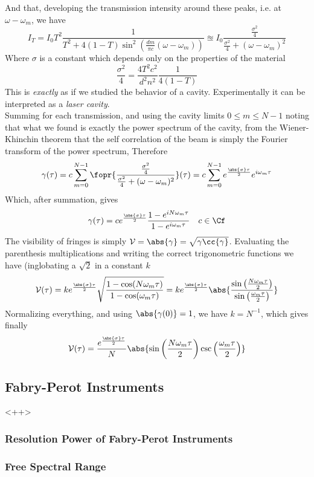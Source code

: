 \documentclass[../electromagnetism.tex]{subfiles}
\begin{document}
And that, developing the transmission intensity around these peaks, i.e. at $\omega-\omega_m$, we have
\begin{equation}
	I_T=I_0T^2\frac{1}{T^2+4(1-T)\sin^2\left( \frac{dm}{\pi c}(\omega-\omega_m) \right)}\approxeq I_0\frac{\frac{\sigma^2}{4}}{\frac{\sigma^2}{4}+(\omega-\omega_m)^2}
	\label{eq:transintdifffreq.mbi}
\end{equation}
Where $\sigma$ is a constant which depends only on the properties of the material
\begin{equation*}
	\frac{\sigma^2}{4}=\frac{4T^2c^2}{d^2n^2}\frac{1}{4(1-T)}
\end{equation*}
This is \textit{exactly} as if we studied the behavior of a cavity. Experimentally it can be interpreted as a \textit{laser cavity}.\\
Summing for each transmission, and using the cavity limits $0\le m\le N-1$ noting that what we found is exactly the power spectrum of the cavity, from the Wiener-Khinchin theorem that the self correlation of the beam is simply the Fourier transform of the power spectrum, Therefore
\begin{equation*}
	\gamma(\tau)=c\sum_{m=0}^{N-1}\fopr{\frac{\frac{\sigma^2}{4}}{\frac{\sigma^2}{4}+(\omega-\omega_m)^2}}(\tau)=c\sum^{N-1}_{m=0}e^{\frac{\abs{\sigma}\tau}{2}}e^{i\omega_m\tau}
\end{equation*}
Which, after summation, gives
\begin{equation}
	\gamma(\tau)=ce^{\frac{\abs{\sigma}\tau}{2}}\frac{1-e^{iN\omega_m\tau}}{1-e^{i\omega_m\tau}}\quad c\in\Cf
	\label{eq:selfcorrlasercavity.mbi}
\end{equation}
The visibility of fringes is simply $\mathcal{V}=\abs{\gamma}=\sqrt{\gamma\cc{\gamma}}$. Evaluating the parenthesis multiplications and writing the correct trigonometric functions we have (inglobating a $\sqrt{2}$ in a constant $k$
\begin{equation}
	\mathcal{V}(\tau)=ke^{\frac{\abs{\sigma}\tau}{2}}\sqrt{\frac{1-\cos(N\omega_m\tau)}{1-\cos(\omega_m\tau)}}=ke^{\frac{\abs{\sigma}\tau}{2}}\abs{\frac{\sin\left( \frac{N\omega_m\tau}{2} \right)}{\sin\left( \frac{\omega_m\tau}{2} \right)}}
	\label{eq:visnonnorm.mbi}
\end{equation}
Normalizing everything, and using $\abs{\gamma(0)}=1$, we have $k=N^{-1}$, which gives finally
\begin{equation}
	\mathcal{V}(\tau)=\frac{e^{\frac{\abs{\sigma}\tau}{2}}}{N}\abs{\sin\left( \frac{N\omega_m\tau}{2} \right)\csc\left( \frac{\omega_m\tau}{2} \right)}
	\label{eq:visibilitylasercavity.mbi}
\end{equation}
\subsection{Fabry-Perot Instruments}
<++>
\subsubsection{Resolution Power of Fabry-Perot Instruments}
\subsubsection{Free Spectral Range}
\end{document}
